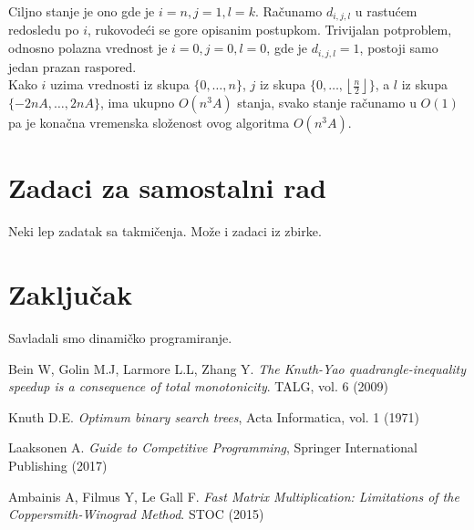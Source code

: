 \documentclass[a4paper,12pt]{article}
\providecommand{\floor}[1]{\left \lfloor #1 \right \rfloor }
\numberwithin{equation}{subsection}
\begin{document}
Ciljno stanje je ono gde je $i=n, j=1, l=k$. Ra\v cunamo $d_{i,j,l}$ u rastu\' cem redosledu po $i$, rukovode\' ci se gore opisanim postupkom. Trivijalan potproblem, odnosno polazna vrednost je $i=0,j=0,l=0$, gde je $d_{i,j,l} = 1$, postoji samo jedan prazan raspored.
\\

Kako $i$ uzima vrednosti iz skupa $\{ 0, \ldots, n \}$, $j$ iz skupa $\{0, \ldots, \floor{\frac{n}{2}} \}$, a $l$ iz skupa $\{ -2nA, \ldots, 2nA \}$, ima ukupno $O(n^3 A)$ stanja, svako stanje ra\v cunamo u $O(1)$ pa je kona\v cna vremenska slo\v zenost ovog algoritma $O(n^3 A)$.

\section{Zadaci za samostalni rad}

Neki lep zadatak sa takmi\v cenja. Mo\v ze i zadaci iz zbirke.

\section{Zaklju\v cak}

Savladali smo dinami\v cko programiranje.


\begin{thebibliography}{10}

 Bein W, Golin M.J, Larmore L.L, Zhang Y. \textit{The Knuth-Yao quadrangle-inequality speedup is a consequence of total monotonicity}. TALG, vol. 6 (2009)

 Knuth D.E. \textit{Optimum binary search trees}, Acta Informatica, vol. 1 (1971)

 Laaksonen A. \textit{Guide to Competitive Programming}, Springer International Publishing (2017)

 Ambainis A, Filmus Y, Le Gall F. \textit{Fast Matrix Multiplication: Limitations of the Coppersmith-Winograd Method}. STOC (2015)

\end{thebibliography}
\end{document}
